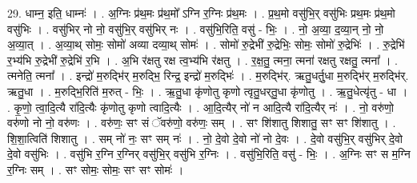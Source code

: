 \documentclass[17pt]{extarticle}
\begin{document}
29. धाम्न॒ इति॒ धाम्नः॑ । . अ॒ग्निः प्र॑थ॒मः प्र॑थ॒मो᳚ ऽग्नि र॒ग्निः प्र॑थ॒मः । . प्र॒थ॒मो वसु॑भि॒र् वसु॑भिः प्रथ॒मः प्र॑थ॒मो वसु॑भिः । . वसु॑भिर् नो नो॒ वसु॑भि॒र् वसु॑भिर् नः । . वसु॑भि॒रिति॒ वसु॑ - भिः॒ । . नो॒ अ॒व्या॒ द॒व्या॒न् नो॒ नो॒ अ॒व्या॒त् । . अ॒व्या॒थ् सोमः॒ सोमो॑ अव्या दव्या॒थ् सोमः॑ । . सोमो॑ रु॒द्रेभी॑ रु॒द्रेभिः॒ सोमः॒ सोमो॑ रु॒द्रेभिः॑ । . रु॒द्रेभि॑ र॒भ्य॑भि रु॒द्रेभी॑ रु॒द्रेभि॑ र॒भि । . अ॒भि र॑क्षतु रक्ष त्व॒भ्य॑भि र॑क्षतु । . र॒क्ष॒तु॒ त्मना॒ त्मना॑ रक्षतु रक्षतु॒ त्मना᳚ । . त्मनेति॒ त्मना᳚ । . इन्द्रो॑ म॒रुद्भि॑र् म॒रुद्भि॒ रिन्द्र॒ इन्द्रो॑ म॒रुद्भिः॑ । . म॒रुद्भि॑र्. ऋतु॒धर्तु॒धा म॒रुद्भि॑र् म॒रुद्भि॑र्. ऋतु॒धा । . म॒रुद्भि॒रिति॑ म॒रुत् - भिः॒ । . ऋ॒तु॒धा कृ॑णोतु कृणो त्वृतु॒धर्‌तु॒धा कृ॑णोतु । . ऋ॒तु॒धेत्यृ॑तु - धा । . कृ॒णो॒ त्वा॒दि॒त्यै रा॑दि॒त्यैः कृ॑णोतु कृणो त्वादि॒त्यैः । . आ॒दि॒त्यैर् नो॑ न आदि॒त्यै रा॑दि॒त्यैर् नः॑ । . नो॒ वरु॑णो॒ वरु॑णो नो नो॒ वरु॑णः । . वरु॑णः॒ सꣳ सं ॅवरु॑णो॒ वरु॑णः॒ सम् । . सꣳ शि॑शातु शिशातु॒ सꣳ सꣳ शि॑शातु । . शि॒शा॒त्विति॑ शिशातु । . सम् नो॑ नः॒ सꣳ सम् नः॑ । . नो॒ दे॒वो दे॒वो नो॑ नो दे॒वः । . दे॒वो वसु॑भि॒र् वसु॑भिर् दे॒वो दे॒वो वसु॑भिः । . वसु॑भि र॒ग्नि र॒ग्निर् वसु॑भि॒र् वसु॑भि र॒ग्निः । . वसु॑भि॒रिति॒ वसु॑ - भिः॒ । . अ॒ग्निः सꣳ स म॒ग्नि र॒ग्निः सम् । . सꣳ सोमः॒ सोमः॒ सꣳ सꣳ सोमः॑ । \newline
\end{document}
